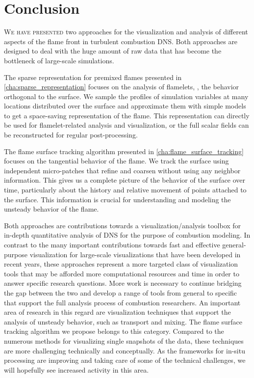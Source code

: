 \chapter{Conclusion} %
\label{cha:flame_vis_conclusions}
%
\lettrine[loversize=-0.015, findent=0pt]{W}{e have presented} two approaches
for the visualization and analysis of different aspects of the flame front in
turbulent combustion \ac{DNS}.
%
Both approaches are designed to deal with the huge amount of raw data that has
become the bottleneck of large-scale simulations.
%

%
The sparse representation for premixed flames presented in
\cref{cha:sparse_representation} focuses on the analysis of flamelets, \ie{}, the
behavior orthogonal to the surface.
%
We sample the profiles of simulation variables at many locations distributed
over the surface and approximate them with simple models to get a space-saving
representation of the flame.
%
This representation can directly be used for flamelet-related analysis and
visualization, or the full scalar fields can be reconstructed for regular
post-processing.
%

%
The flame surface tracking algorithm presented in
\cref{cha:flame_surface_tracking} focuses on the tangential behavior of the
flame.
%
We track the surface using independent micro-patches that refine and coarsen
without using any neighbor information.
%
This gives us a complete picture of the behavior of the surface over time,
particularly about the history and relative movement of points attached to the
surface.
%
This information is crucial for understanding and modeling the unsteady behavior
of the flame.
%

%
Both approaches are contributions towards a visualization/analysis toolbox for
in-depth quantitative analysis of \ac{DNS} for the purpose of combustion
modeling.
%
In contrast to the many important contributions towards fast and effective
general-purpose visualization for large-scale visualizations that have been
developed in recent years, these approaches represent a more targeted class
of visualization tools that may be afforded more computational resources and
time in order to answer specific research questions.
%
More work is necessary to continue bridging the gap between the two and
develop a range of tools from general to specific that support the full analysis
process of combustion researchers.
%
An important area of research in this regard are visualization techniques that
support the analysis of unsteady behavior, such as transport and mixing.
%
The flame surface tracking algorithm we propose belongs to this category.
%
Compared to the numerous methods for visualizing single snapshots of the data,
these techniques are more challenging technically and conceptually.
%
As the frameworks for in-situ processing are improving and taking care of some
of the technical challenges, we will hopefully see increased activity in this
area.
%
